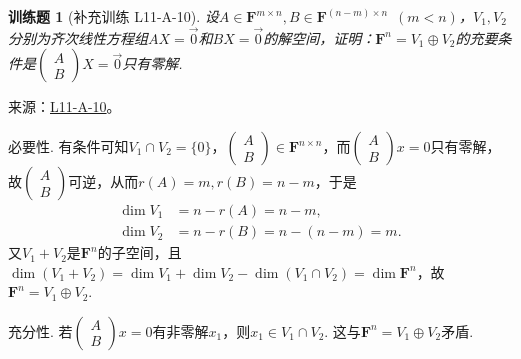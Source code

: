 \documentclass[UTF8,12pt,a4paper,fontset=fandol]{ctexart}
\newtheorem{exercise}{训练题}[section]
\begin{document}
\begin{exercise}[补充训练 L11-A-10]\label{prob:L11-A-10}
设$A \in \mathbf{F}^{m \times n},B \in \mathbf{F}^{(n-m) \times n}\enspace(m<n)$，$V_1,V_2$分别为齐次线性方程组$AX=\vec{0}$和$BX=\vec{0}$的解空间，证明：$\mathbf{F}^n=V_1\oplus V_2$的充要条件是$\begin{pmatrix} A \\ B \end{pmatrix}X=\vec{0}$只有零解.
\end{exercise}
\noindent 来源：\href{https://github.com/yhwu-is/Linear-Algebra-Left-Undone/blob/new/%E8%AE%B2%E4%B9%89/%E4%B8%93%E9%A2%98/11%20%E6%9C%9D%E8%8A%B1%E5%A4%95%E6%8B%BE.tex}{L11-A-10}。
\begin{solve}
必要性. 有条件可知$V_1\cap V_2=\{0\}$，$\begin{pmatrix}A\\B\end{pmatrix}\in\mathbf{F}^{n\times n}$，而$\begin{pmatrix}A\\B\end{pmatrix}x=0$只有零解，故$\begin{pmatrix}A\\B\end{pmatrix}$可逆，从而$r(A)=m,r(B)=n-m$，于是
          \begin{align*}
              \dim V_1 & =n-r(A)=n-m,       \\
              \dim V_2 & =n-r(B)=n-(n-m)=m.
          \end{align*}
          又$V_1+V_2$是$\mathbf{F}^n$的子空间，且$\dim(V_1+V_2)=\dim V_1+\dim V_2-\dim(V_1\cap V_2)=\dim\mathbf{F}^n$，故$\mathbf{F}^n=V_1\oplus V_2$.

          充分性. 若$\begin{pmatrix}A\\B\end{pmatrix}x=0$有非零解$x_1$，则$x_1\in V_1\cap V_2$. 这与$\mathbf{F}^n=V_1\oplus V_2$矛盾.
\end{solve}
\end{document}

